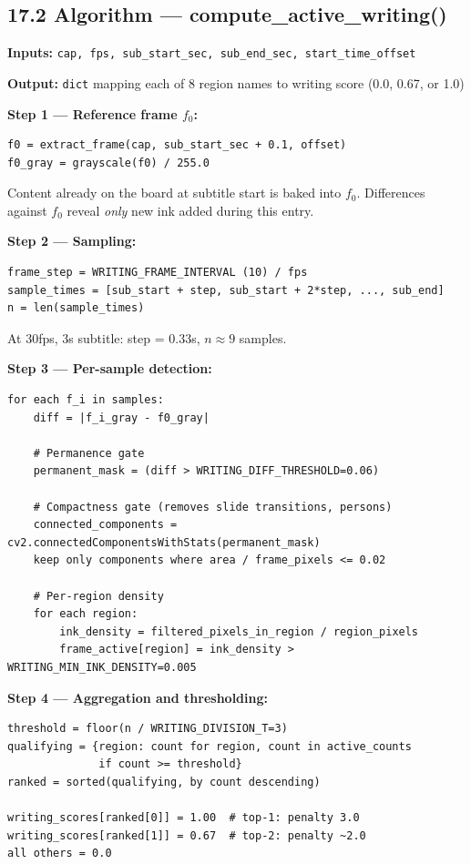 \documentclass[11pt]{article}
\begin{document}
\subsection*{17.2 Algorithm --- compute\_active\_writing()}

\textbf{Inputs:} \texttt{cap, fps, sub\_start\_sec, sub\_end\_sec, start\_time\_offset}

\textbf{Output:} \texttt{dict} mapping each of 8 region names to writing score (0.0, 0.67, or 1.0)

\textbf{Step 1 --- Reference frame $f_0$:}
\begin{verbatim}
f0 = extract_frame(cap, sub_start_sec + 0.1, offset)
f0_gray = grayscale(f0) / 255.0
\end{verbatim}
Content already on the board at subtitle start is baked into $f_0$. Differences against $f_0$ reveal \emph{only} new ink added during this entry.

\textbf{Step 2 --- Sampling:}
\begin{verbatim}
frame_step = WRITING_FRAME_INTERVAL (10) / fps
sample_times = [sub_start + step, sub_start + 2*step, ..., sub_end]
n = len(sample_times)
\end{verbatim}
At 30fps, 3s subtitle: step = 0.33s, $n \approx 9$ samples.

\textbf{Step 3 --- Per-sample detection:}
\begin{verbatim}
for each f_i in samples:
    diff = |f_i_gray - f0_gray|

    # Permanence gate
    permanent_mask = (diff > WRITING_DIFF_THRESHOLD=0.06)

    # Compactness gate (removes slide transitions, persons)
    connected_components = cv2.connectedComponentsWithStats(permanent_mask)
    keep only components where area / frame_pixels <= 0.02

    # Per-region density
    for each region:
        ink_density = filtered_pixels_in_region / region_pixels
        frame_active[region] = ink_density > WRITING_MIN_INK_DENSITY=0.005
\end{verbatim}

\textbf{Step 4 --- Aggregation and thresholding:}
\begin{verbatim}
threshold = floor(n / WRITING_DIVISION_T=3)
qualifying = {region: count for region, count in active_counts
              if count >= threshold}
ranked = sorted(qualifying, by count descending)

writing_scores[ranked[0]] = 1.00  # top-1: penalty 3.0
writing_scores[ranked[1]] = 0.67  # top-2: penalty ~2.0
all others = 0.0
\end{verbatim}
\end{document}
